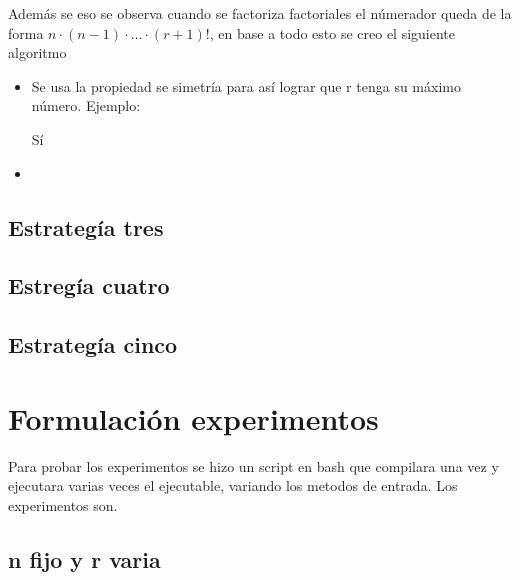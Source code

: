 \documentclass[12pt,letterpaper]{scrartcl}
\begin{document}
Además se eso se observa cuando se factoriza factoriales el númerador queda de la forma $n \cdot (n-1) \cdot \ldots \cdot (r+1)!$, en base a todo esto se creo el siguiente algoritmo

\begin{itemize}
\item Se usa la propiedad se simetría para así lograr que r tenga su máximo número. Ejemplo:

Sí 

\item
\end{itemize}




\subsection{Estrategía tres}

\subsection{Estregía cuatro}

\subsection{Estrategía cinco}



\section{Formulación experimentos}

Para probar los experimentos se hizo un script en bash que compilara una vez y ejecutara varias veces el ejecutable, variando los metodos de entrada. Los experimentos son.

\subsection{n fijo y r varia}
\end{document}
